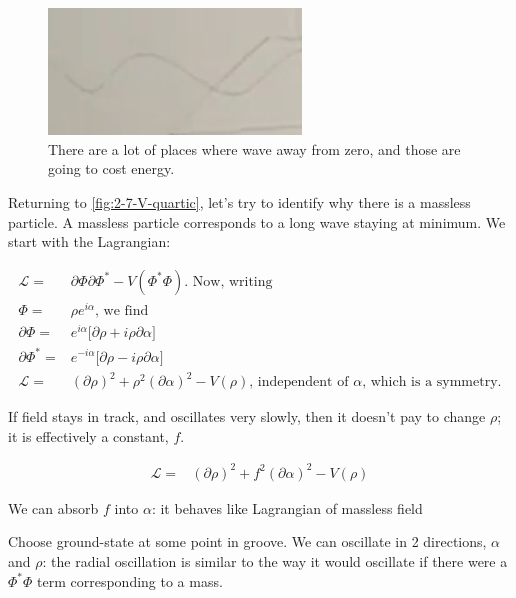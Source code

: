 \documentclass[]{article}
\begin{document}
\begin{figure}[H]
	\begin{center}
		\caption[There are a lot of places where wave away from zero]{There are a lot of places where wave away from zero, and those are going to cost energy.}\label{fig:2-7-variation-from-zero}
		\includegraphics[width=0.6\textwidth]{2-7-variation-from-zero}
	\end{center}
\end{figure}

Returning to \ref{fig:2-7-V-quartic}, let's try to identify why there is a massless particle. A massless particle corresponds to a long wave staying at minimum. We start with the Lagrangian:

\begin{align*}
	\mathcal{L} =& \partial \Phi \partial \Phi^* - V(\Phi^*\Phi) \text{. Now, writing}\\
	\Phi =& \rho e^{i \alpha} \text{, we find} \\
	\partial \Phi =& e^{i \alpha} \big[\partial \rho + i \rho \partial \alpha\big]\\
	\partial \Phi^* =& e^{-i \alpha} \big[\partial \rho - i \rho \partial \alpha\big]\\
	\mathcal{L} =& (\partial \rho)^2 + \rho^2  (\partial \alpha)^2 - V(\rho) \text{, independent of $\alpha$, which is a symmetry.} 
\end{align*}

If field stays in track, and oscillates very slowly, then it doesn't pay to change $\rho$; it is effectively a constant, $f$.

\begin{align*}
	\mathcal{L} =& (\partial \rho)^2 + f^2(\partial \alpha)^2   - V(\rho)
\end{align*}

We can absorb $f$ into $\alpha$: it behaves like Lagrangian of massless field

Choose ground-state at some point in groove. We can oscillate in 2 directions, $\alpha$ and $\rho$: the radial oscillation is similar to the way it would oscillate if there were a $\Phi^*\Phi$ term corresponding to a mass.
\end{document}
